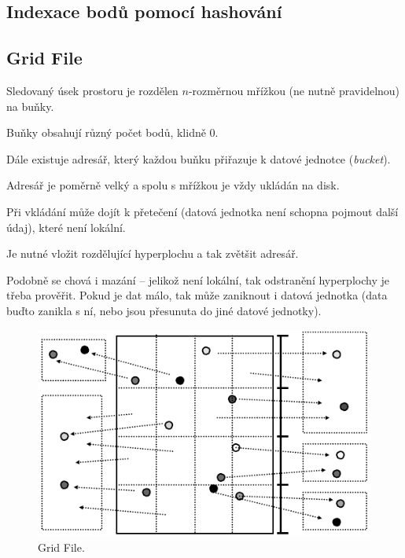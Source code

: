 \subsection{Indexace bodů pomocí hashování}

\subsection{Grid File}

\begin{compactitem}
    \item Sledovaný úsek prostoru je rozdělen $n$-rozměrnou mřížkou (ne nutně pravidelnou) na buňky. \begin{compactitem}
        \item Buňky obsahují různý počet bodů, klidně 0.
    \end{compactitem}

    \item Dále existuje adresář, který každou buňku přiřazuje k datové jednotce (\textit{bucket}). \begin{compactitem}
        \item Adresář je poměrně velký a spolu s mřížkou je vždy ukládán na disk.
    \end{compactitem}

    \item Při vkládání může dojít k přetečení (datová jednotka není schopna pojmout další údaj), které není lokální. \begin{compactitem}
        \item Je nutné vložit rozdělující hyperplochu a tak zvětšit adresář.
        \item Podobně se chová i mazání -- jelikož není lokální, tak odstranění hyperplochy je třeba prověřit. Pokud je dat málo, tak může zaniknout i datová jednotka (data buďto zanikla s ní, nebo jsou přesunuta do jiné datové jednotky).
    \end{compactitem}
\end{compactitem}

\begin{figure}[H]
    \centering
    \includegraphics[width=0.75\linewidth]{grid_file.pdf}
    \caption{Grid File.}
\end{figure}

